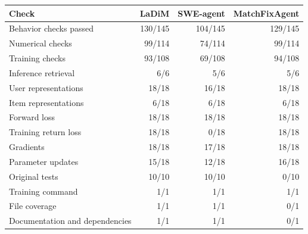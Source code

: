\begin{tabular*}{\linewidth}{@{\extracolsep{\fill}}lrrr@{}}
\toprule
\textbf{Check} & \textbf{LaDiM} & \textbf{SWE-agent} & \textbf{MatchFixAgent} \\
\midrule
Behavior checks passed & 130/145 & 104/145 & 129/145 \\
Numerical checks & 99/114 & 74/114 & 99/114 \\
Training checks & 93/108 & 69/108 & 94/108 \\
Inference retrieval & 6/6 & 5/6 & 5/6 \\
\midrule
User representations & 18/18 & 16/18 & 18/18 \\
Item representations & 6/18 & 6/18 & 6/18 \\
Forward loss & 18/18 & 18/18 & 18/18 \\
Training return loss & 18/18 & 0/18 & 18/18 \\
Gradients & 18/18 & 17/18 & 18/18 \\
Parameter updates & 15/18 & 12/18 & 16/18 \\
\midrule
Original tests & 10/10 & 10/10 & 0/10 \\
Training command & 1/1 & 1/1 & 1/1 \\
File coverage & 1/1 & 1/1 & 0/1 \\
Documentation and dependencies & 1/1 & 1/1 & 0/1 \\
\bottomrule
\end{tabular*}
